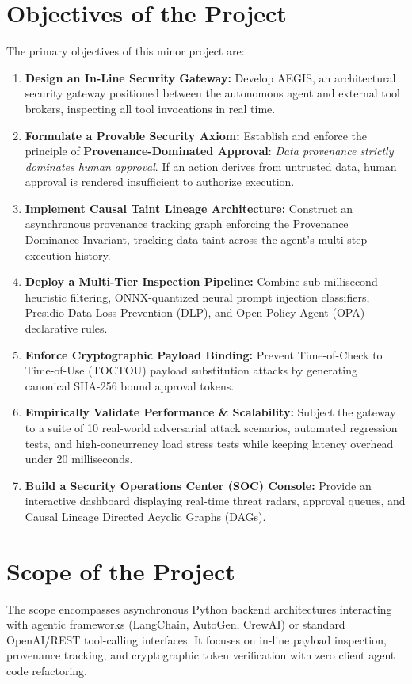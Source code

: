 \section{Objectives of the Project}
The primary objectives of this minor project are:
\begin{enumerate}
    \item \textbf{Design an In-Line Security Gateway:} Develop AEGIS, an architectural security gateway positioned between the autonomous agent and external tool brokers, inspecting all tool invocations in real time.
    \item \textbf{Formulate a Provable Security Axiom:} Establish and enforce the principle of \textbf{Provenance-Dominated Approval}: \textit{Data provenance strictly dominates human approval}. If an action derives from untrusted data, human approval is rendered insufficient to authorize execution.
    \item \textbf{Implement Causal Taint Lineage Architecture:} Construct an asynchronous provenance tracking graph enforcing the Provenance Dominance Invariant, tracking data taint across the agent's multi-step execution history.
    \item \textbf{Deploy a Multi-Tier Inspection Pipeline:} Combine sub-millisecond heuristic filtering, ONNX-quantized neural prompt injection classifiers, Presidio Data Loss Prevention (DLP), and Open Policy Agent (OPA) declarative rules.
    \item \textbf{Enforce Cryptographic Payload Binding:} Prevent Time-of-Check to Time-of-Use (TOCTOU) payload substitution attacks by generating canonical SHA-256 bound approval tokens.
    \item \textbf{Empirically Validate Performance \& Scalability:} Subject the gateway to a suite of 10 real-world adversarial attack scenarios, automated regression tests, and high-concurrency load stress tests while keeping latency overhead under 20 milliseconds.
    \item \textbf{Build a Security Operations Center (SOC) Console:} Provide an interactive dashboard displaying real-time threat radars, approval queues, and Causal Lineage Directed Acyclic Graphs (DAGs).
\end{enumerate}

\section{Scope of the Project}
The scope encompasses asynchronous Python backend architectures interacting with agentic frameworks (LangChain, AutoGen, CrewAI) or standard OpenAI/REST tool-calling interfaces. It focuses on in-line payload inspection, provenance tracking, and cryptographic token verification with zero client agent code refactoring.


